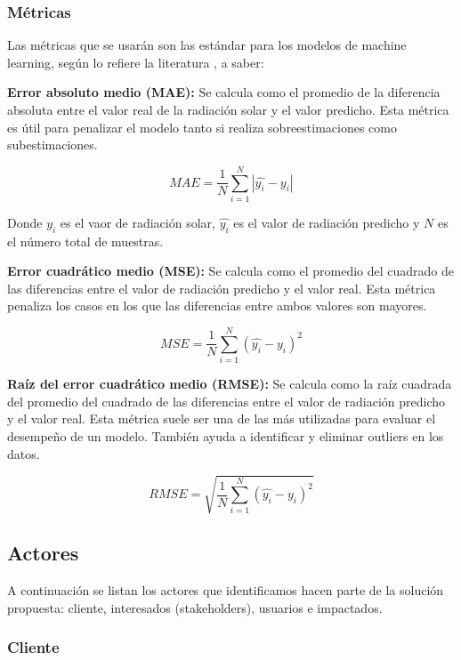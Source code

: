 \documentclass[a4paper]{article}
\begin{document}
\subsubsection{Métricas}

Las métricas que se usarán son las estándar para los modelos de machine learning, según lo refiere la literatura \cite{ref:calcradsol}, a saber:

\textbf{Error absoluto medio (MAE):} Se calcula como el promedio de la diferencia absoluta entre el valor real de la radiación solar y el valor predicho. Esta métrica es útil para penalizar el modelo tanto si realiza sobreestimaciones como subestimaciones.

\begin{equation}
    MAE = \frac{1}{N}\sum_{i=1}^{N}|\hat{y_{i}}-y_{i}|
\end{equation}

Donde $y_{i}$ es el vaor de radiación solar, $\hat{y_{i}}$ es el valor de radiación predicho y $N$ es el número total de muestras.

\textbf{Error cuadrático medio (MSE):} Se calcula como el promedio del cuadrado de las diferencias entre el valor de radiación predicho y el valor real. Esta métrica penaliza los casos en los que las diferencias entre ambos valores son mayores.

\begin{equation}
    MSE = \frac{1}{N}\sum_{i=1}^{N}(\hat{y_{i}}-y_{i})^{2}
\end{equation}

\textbf{Raíz del error cuadrático medio (RMSE):}  Se calcula como la raíz cuadrada del promedio del cuadrado de las diferencias entre el valor de radiación predicho y el valor real. Esta métrica suele ser una de las más utilizadas para evaluar el desempeño de un modelo. También ayuda a identificar y eliminar outliers en los datos.

\begin{equation}
    RMSE = \sqrt{\frac{1}{N}\sum_{i=1}^{N}(\hat{y_{i}}-y_{i})^{2}}
\end{equation}

\subsection{Actores}

A continuación se listan los actores que identificamos hacen parte de la solución propuesta: cliente, interesados (stakeholders), usuarios e impactados.

\subsubsection{Cliente}
\end{document}

